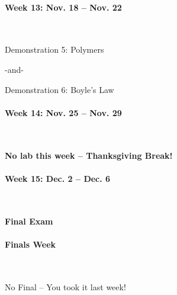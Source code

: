 \documentclass[12pt, letterpaper]{article}
\begin{document}
\paragraph{Week 13: Nov. 18 -- Nov. 22}~

Demonstration 5: Polymers

-and-

Demonstration 6: Boyle's Law

\paragraph{Week 14: Nov. 25 -- Nov. 29}~

\textbf{No lab this week -- Thanksgiving Break!}

\paragraph{Week 15: Dec. 2 -- Dec. 6}~

\textbf{Final Exam}

\paragraph{Finals Week}~

No Final -- You took it last week!
\end{document}
